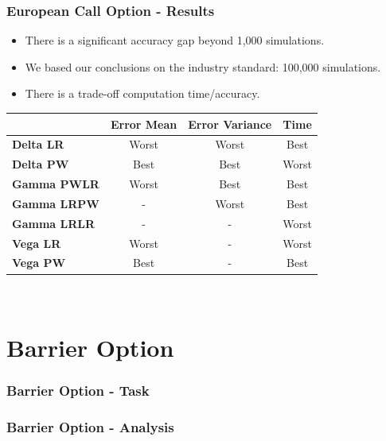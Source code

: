 \documentclass[12pt]{beamer}
\begin{document}
\begin{frame}
\frametitle{European Call Option - Results}
\begin{itemize}
  \item There is a significant accuracy gap beyond 1,000 simulations.
  \item We based our conclusions on the industry standard: 100,000 simulations.
  \item There is a trade-off computation time/accuracy.
\end{itemize}



\begin{table}
  \centering
\begin{tabular}{|l|c|c|c|}
\hline
& \textbf{Error Mean} & \textbf{Error Variance} & \textbf{Time} \\ \hline
\textbf{Delta LR} & Worst & Worst & Best\\
\textbf{Delta PW} & Best & Best & Worst\\ \hline
\textbf{Gamma PWLR} & Worst & Best & Best\\
\textbf{Gamma LRPW} & - & Worst & Best\\
\textbf{Gamma LRLR} & - & - & Worst\\ \hline
\textbf{Vega LR} & Worst & - & Worst\\
\textbf{Vega PW} & Best & - & Best\\ \hline
\end{tabular}\\

\end{table}

\end{frame}




\section{Barrier Option}
\begin{frame}
\frametitle{Barrier Option - Task}

\end{frame}

\begin{frame}
\frametitle{Barrier Option - Analysis}
\end{frame}
\end{document}
